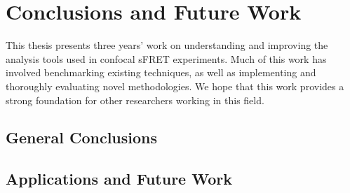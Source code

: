 \chapter{Conclusions and Future Work}
\label{chap:conclusions}

This thesis presents three years' work on understanding and improving the analysis tools used in confocal sFRET experiments. Much of this work has involved benchmarking existing techniques, as well as implementing and thoroughly evaluating novel methodologies. We hope that this work provides a strong foundation for other researchers working in this field.

\section{General Conclusions}
\section{Applications and Future Work}

